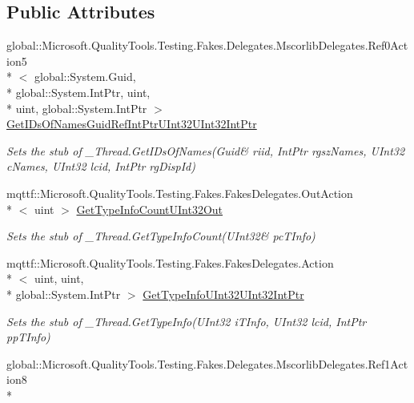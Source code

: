 \subsection*{Public Attributes}
\begin{DoxyCompactItemize}
\item 
global\-::\-Microsoft.\-Quality\-Tools.\-Testing.\-Fakes.\-Delegates.\-Mscorlib\-Delegates.\-Ref0\-Action5\\*
$<$ global\-::\-System.\-Guid, \\*
global\-::\-System.\-Int\-Ptr, uint, \\*
uint, global\-::\-System.\-Int\-Ptr $>$ \hyperlink{class_system_1_1_runtime_1_1_interop_services_1_1_fakes_1_1_stub___thread_a89a987d79bc76a1004c935029bdaa84c}{Get\-I\-Ds\-Of\-Names\-Guid\-Ref\-Int\-Ptr\-U\-Int32\-U\-Int32\-Int\-Ptr}
\begin{DoxyCompactList}\small\item\em Sets the stub of \-\_\-\-Thread.\-Get\-I\-Ds\-Of\-Names(Guid\& riid, Int\-Ptr rgsz\-Names, U\-Int32 c\-Names, U\-Int32 lcid, Int\-Ptr rg\-Disp\-Id)\end{DoxyCompactList}\item 
mqttf\-::\-Microsoft.\-Quality\-Tools.\-Testing.\-Fakes.\-Fakes\-Delegates.\-Out\-Action\\*
$<$ uint $>$ \hyperlink{class_system_1_1_runtime_1_1_interop_services_1_1_fakes_1_1_stub___thread_a624b209b6951ac3bf073af10e0756cca}{Get\-Type\-Info\-Count\-U\-Int32\-Out}
\begin{DoxyCompactList}\small\item\em Sets the stub of \-\_\-\-Thread.\-Get\-Type\-Info\-Count(U\-Int32\& pc\-T\-Info)\end{DoxyCompactList}\item 
mqttf\-::\-Microsoft.\-Quality\-Tools.\-Testing.\-Fakes.\-Fakes\-Delegates.\-Action\\*
$<$ uint, uint, \\*
global\-::\-System.\-Int\-Ptr $>$ \hyperlink{class_system_1_1_runtime_1_1_interop_services_1_1_fakes_1_1_stub___thread_a07392e5033d17969feb89f88dfd06e15}{Get\-Type\-Info\-U\-Int32\-U\-Int32\-Int\-Ptr}
\begin{DoxyCompactList}\small\item\em Sets the stub of \-\_\-\-Thread.\-Get\-Type\-Info(\-U\-Int32 i\-T\-Info, U\-Int32 lcid, Int\-Ptr pp\-T\-Info)\end{DoxyCompactList}\item 
global\-::\-Microsoft.\-Quality\-Tools.\-Testing.\-Fakes.\-Delegates.\-Mscorlib\-Delegates.\-Ref1\-Action8\\*

\end{DoxyCompactItemize}

